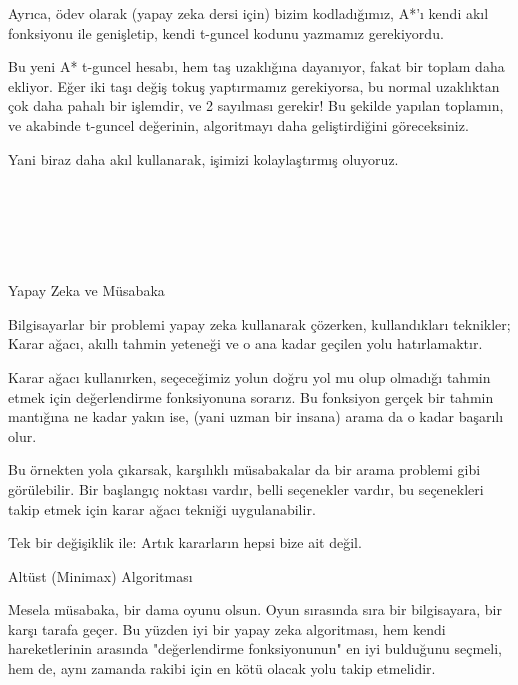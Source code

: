 \documentclass[12pt,fleqn]{article}\usepackage{../../common}
\begin{document}
Ayrıca, ödev olarak (yapay zeka dersi için) bizim kodladığımız, A*'ı kendi
akıl fonksiyonu ile genişletip, kendi t-guncel kodunu yazmamız
gerekiyordu. 

Bu yeni A* t-guncel hesabı, hem taş uzaklığına dayanıyor, fakat bir toplam
daha ekliyor. Eğer iki taşı değiş tokuş yaptırmamız gerekiyorsa, bu normal
uzaklıktan çok daha pahalı bir işlemdir, ve 2 sayılması gerekir! Bu şekilde
yapılan toplamın, ve akabinde t-guncel değerinin, algoritmayı daha
geliştirdiğini göreceksiniz.

Yani biraz daha akıl kullanarak, işimizi kolaylaştırmış oluyoruz.

\inputminted[fontsize=\footnotesize]{python}{ortak.lisp}

\inputminted[fontsize=\footnotesize]{python}{kat-kat-ara.lisp}

\inputminted[fontsize=\footnotesize]{python}{kat-engelli-da.lisp}

\inputminted[fontsize=\footnotesize]{python}{iki-yonlu-arama.lisp}

\inputminted[fontsize=\footnotesize]{python}{git-gide-derin-kka.lisp}

\inputminted[fontsize=\footnotesize]{python}{fiyati-sabit-arama.lisp}

\inputminted[fontsize=\footnotesize]{python}{a-yildiz-arama.lisp}

Yapay Zeka ve Müsabaka

Bilgisayarlar bir problemi yapay zeka kullanarak çözerken, kullandıkları
teknikler; Karar ağacı, akıllı tahmin yeteneği ve o ana kadar geçilen yolu
hatırlamaktır.

Karar ağacı kullanırken, seçeceğimiz yolun doğru yol mu olup olmadığı
tahmin etmek için değerlendirme fonksiyonuna sorarız. Bu fonksiyon gerçek bir
tahmin mantığına ne kadar yakın ise, (yani uzman bir insana) arama da o
kadar başarılı olur.

Bu örnekten yola çıkarsak, karşılıklı müsabakalar da bir arama problemi
gibi görülebilir. Bir başlangıç noktası vardır, belli seçenekler vardır, bu
seçenekleri takip etmek için karar ağacı tekniği uygulanabilir.

Tek bir değişiklik ile: Artık kararların hepsi bize ait değil.

Altüst (Minimax) Algoritması

Mesela müsabaka, bir dama oyunu olsun. Oyun sırasında sıra bir bilgisayara,
bir karşı tarafa geçer. Bu yüzden iyi bir yapay zeka algoritması, hem kendi
hareketlerinin arasında "değerlendirme fonksiyonunun" en iyi bulduğunu seçmeli,
hem de, aynı zamanda rakibi için en kötü olacak yolu takip etmelidir.
\end{document}
